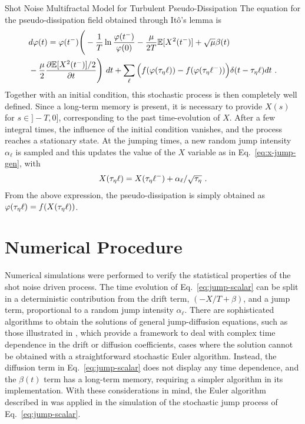 \begin{chapter}{Shot Noise Multifractal Model for Turbulent Pseudo-Dissipation}
The equation for the pseudo-dissipation field obtained through It\^o's lemma is
\begin{equation} \label{eq:phi-x}
\begin{split}
    &d\varphi(t) = \varphi(t^-)
    \Bigg( - \frac{1}{T} \ln \frac{\varphi(t^-)}{\varphi(0)} -     \frac{\mu}{2 T} \mathbb{E}[X^2(t^-)] + \sqrt{\mu} \beta(t) \\ &- \frac{\mu}{2} \frac{\partial \mathbb{E}[X^2(t^-)]/2 }{\partial t} \Bigg) \ dt + \sum_{\ell} \Big( f(\varphi(\tau_{\eta} \ell)) - f(\varphi(\tau_{\eta} \ell^-)) \Big) \delta(t-\tau_{\eta} \ell) dt \ .
        \end{split}
\end{equation}
Together with an initial condition, this stochastic process is then completely well defined.
Since a long-term memory is present, it is necessary to provide $X(s)$ for $s \in ]-T,0]$, corresponding to the past time-evolution of $X$. After a few integral times, the influence of the initial condition vanishes, and the process reaches a stationary state. At the jumping times, a new random jump intensity $\alpha_{\ell}$ is sampled and this updates the value of the $X$ variable as in Eq.~\eqref{eq:x-jump-gen}, with
\begin{equation}
    X(\tau_{\eta} \ell) = X(\tau_{\eta} \ell^-) + \alpha_{\ell} / \sqrt{\tau_{\eta}} \ .
\end{equation}
From the above expression, the pseudo-dissipation is simply obtained as $\varphi(\tau_{\eta} \ell) = f(X(\tau_{\eta} \ell))$.

\section{Numerical Procedure} \label{sec:numerical}

Numerical simulations were performed to verify the statistical properties of the shot noise driven process. The time evolution of Eq.~\eqref{eq:jump-scalar} can be split in a deterministic contribution from the drift term, $(-X/T+\beta)$, and a jump term, proportional to a random jump intensity $\alpha_{\ell}$. There are sophisticated algorithms to obtain the solutions of general jump-diffusion equations, such as those illustrated in \textcite{casella2011,gonccalves2014}, which provide a framework to deal with complex time dependence in the drift or diffusion coefficients, cases where the solution cannot be obtained with a straightforward stochastic Euler algorithm. Instead, the diffusion term in Eq.~\eqref{eq:jump-scalar} does not display any time dependence, and the $\beta(t)$ term has a long-term memory, requiring a simpler algorithm in its implementation. With these considerations in mind, the Euler algorithm described in \textcite{casella2011} was applied in the simulation of the stochastic jump process of Eq.~\eqref{eq:jump-scalar}.


\end{chapter}
